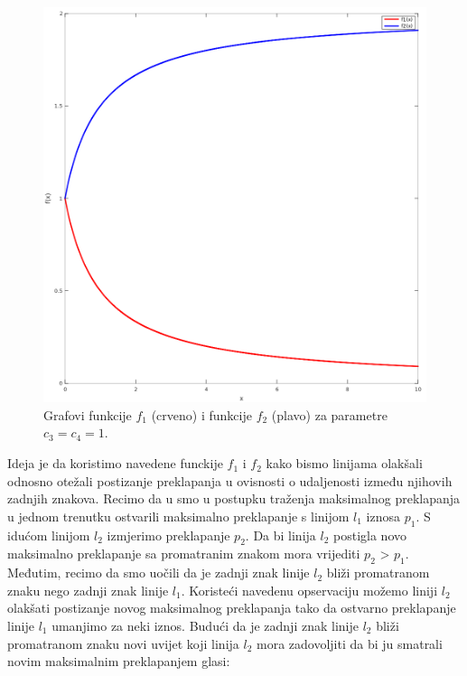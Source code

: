 \documentclass[times, utf8, zavrsni]{fer}
\begin{document}
\begin{figure}[htb]
    \centering
    \captionsetup{justification=centering,margin=2cm}
    \includegraphics[width=\textwidth]{images/function-01.png}
    \caption{
        Grafovi funkcije $f_1$ (crveno) i funkcije $f_2$ (plavo) za parametre
        $c_3 = c_4 = 1$.
    }
    \label{fig:function-01}
\end{figure}

Ideja je da koristimo navedene funckije $f_1$ i $f_2$ kako bismo linijama
olakšali odnosno otežali postizanje preklapanja u ovisnosti o udaljenosti između
njihovih zadnjih znakova. Recimo da u smo u postupku traženja maksimalnog
preklapanja u jednom trenutku ostvarili maksimalno preklapanje s linijom $l_1$
iznosa $p_1$. S idućom linijom $l_2$ izmjerimo preklapanje $p_2$. Da bi linija
$l_2$ postigla novo maksimalno preklapanje sa promatranim znakom mora vrijediti
$p_2$ > $p_1$. Međutim, recimo da smo uočili da je zadnji znak linije $l_2$
bliži promatranom znaku nego zadnji znak linije $l_1$. Koristeći navedenu
opservaciju možemo liniji $l_2$ olakšati postizanje novog maksimalnog
preklapanja tako da ostvarno preklapanje linije $l_1$ umanjimo za neki iznos.
Budući da je zadnji znak linije $l_2$ bliži promatranom znaku novi uvijet koji
linija $l_2$ mora zadovoljiti da bi ju smatrali novim maksimalnim preklapanjem
glasi:
\end{document}
